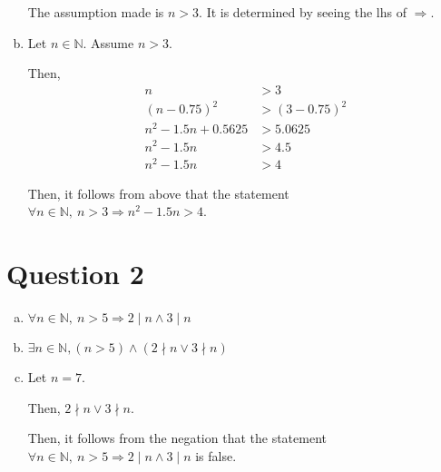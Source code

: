 \documentclass[12pt]{article}
\begin{document}
\begin{enumerate}[a.]
    The assumption made is $n > 3$. It is determined by seeing the lhs of
    $\Rightarrow$.

    \item

    Let $n \in \mathbb{N}$. Assume $n > 3$.

    \bigskip

    Then,
    \setcounter{equation}{0}
    \begin{align}
        n &> 3\\
        (n - 0.75)^2 &> (3 - 0.75)^2\\
        n^2 - 1.5n + 0.5625 &> 5.0625\\
        n^2 - 1.5n &> 4.5\\
        n^2 - 1.5n &> 4
    \end{align}

    \bigskip

    Then, it follows from above that the statement $\forall n \in \mathbb{N},\:
    n > 3 \Rightarrow n^2 - 1.5n > 4$.

\end{enumerate}

\section*{Question 2}
\begin{enumerate}[a.]
    \item

    $\forall n \in \mathbb{N},\:n > 5 \Rightarrow 2 \mid n \land 3 \mid n$

    \item

    $\exists n \in \mathbb{N}, (n > 5) \land (2 \nmid n \lor 3 \nmid n)$

    \item

    Let $n = 7$.

    \bigskip

    Then, $2 \nmid n \lor 3 \nmid n$.

    \bigskip

    Then, it follows from the negation that the statement $\forall n \in \mathbb{N},\:
    n >5 \Rightarrow 2 \mid n \land 3 \mid n$ is false.
\end{enumerate}
\end{document}
